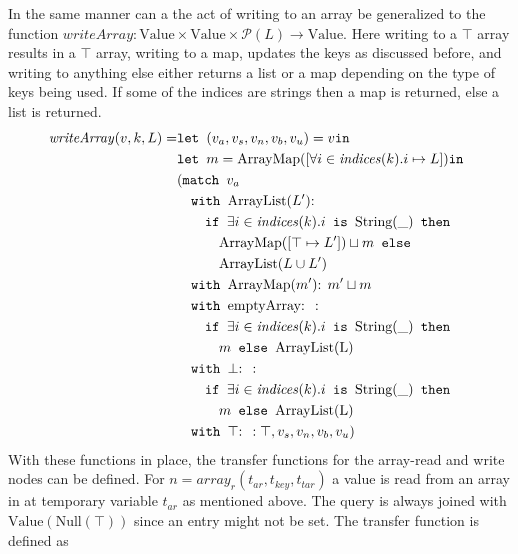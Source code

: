 In the same manner can a the act of writing to an array be generalized to the function $\mathit{writeArray}: \text{Value} \times \text{Value} \times \mathcal{P}(L) \rightarrow \text{Value}$. Here writing to a $\top$ array results in a $\top$ array, writing to a map, updates the keys as discussed before, and writing to anything else either returns a list or a map depending on the type of keys being used. If some of the indices are strings then a map is returned, else a list is returned. 
\begin{align}
\mathit{writeArray}(v, k, L) =       & \texttt{let } (v_a,v_s,v_n,v_b,v_u) = v \texttt{in }\notag\\
                            &\texttt{let } m = \text{ArrayMap}([\forall i \in \mathit{indices}(k). i \mapsto L]) \texttt{in }\notag\\
                            &(\texttt{match }v_a \notag\\
                            & \quad \texttt{with }\text{ArrayList}(L')\text{: } \notag\\
                            &\quad\quad \texttt{if }\exists i \in \mathit{indices}(k).i \texttt{ is } \text{String}(\_)\texttt{ then } \notag\\
                            &\quad\quad\quad \text{ArrayMap}([\top \mapsto L'])\sqcup m \texttt{ else } \notag\\
                            &\quad\quad\quad \text{ArrayList}(L\cup L')\notag\\
                            & \quad \texttt{with }\text{ArrayMap}(m')\text{: } m'\sqcup m\notag\\
                            & \quad \texttt{with }\text{emptyArray}\text{: } : \notag\\
                            & \quad\quad\texttt{if }\exists i \in \mathit{indices}(k).i \texttt{ is } \text{String}(\_)\texttt{ then } \notag\\
                            &\quad\quad\quad m \texttt{ else } \text{ArrayList(L)}\notag\\
                            & \quad \texttt{with }\bot\text{: }  : \notag\\
                            & \quad\quad\texttt{if }\exists i \in \mathit{indices}(k).i \texttt{ is } \text{String}(\_)\texttt{ then } \notag\\
                            &\quad\quad\quad m \texttt{ else } \text{ArrayList(L)}\notag\\
                            & \quad \texttt{with }\top\text{: } : \top, v_s, v_n, v_b, v_u)
\end{align}
With these functions in place, the transfer functions for the array-read and write nodes can be defined. For $n = \mathit{array}_r(t_{ar},t_{key},t_{tar})$ a value is read from an array in at temporary variable $t_{ar}$ as mentioned above. The query is always joined with $\text{Value}(\text{Null}(\top))$ since an entry might not be set. The transfer function is defined as
